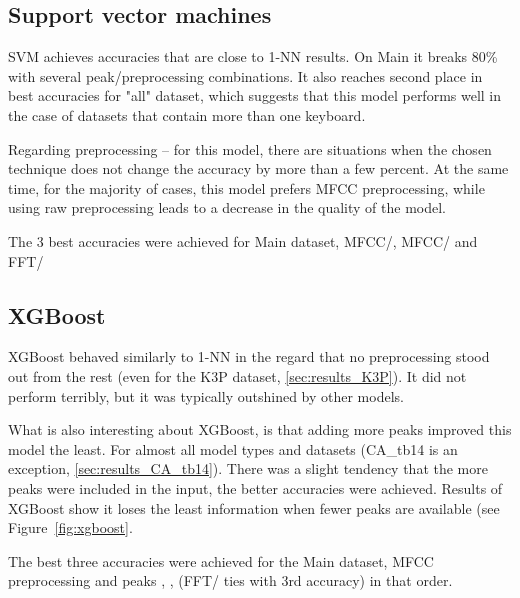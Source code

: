 \documentclass[../main.tex]{subfiles}
\begin{document}


\subsection{Support vector machines}
SVM achieves accuracies that are close to 1-NN results. On Main it breaks 80\% with several peak/preprocessing combinations. It also reaches second place in best accuracies for "all" dataset, which suggests that this model performs well in the case of datasets that contain more than one keyboard. 

Regarding preprocessing -- for this model, there are situations when the chosen technique does not change the accuracy by more than a few percent. At the same time, for the majority of cases, this model prefers MFCC preprocessing, while using raw preprocessing leads to a decrease in the quality of the model.

The 3 best accuracies were achieved for Main dataset, MFCC/, MFCC/ and FFT/

\subsection{XGBoost}
XGBoost behaved similarly to 1-NN in the regard that no preprocessing stood out from the rest (even for the K3P dataset, \ref{sec:results_K3P}). It did not perform terribly, but it was typically outshined by other models. 

What is also interesting about XGBoost, is that adding more peaks improved this model the least. For almost all model types and datasets (CA\_tb14 is an exception, \ref{sec:results_CA_tb14}). There was a slight tendency that the more peaks were included in the input, the better accuracies were achieved. Results of XGBoost show it loses the least information when fewer peaks are available (see Figure~\ref{fig:xgboost}. 

The best three accuracies were achieved for the Main dataset, MFCC preprocessing and peaks , ,  (FFT/ ties with 3rd accuracy) in that order. 


\end{document}
